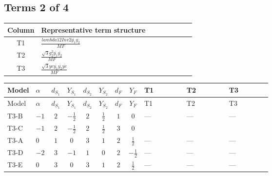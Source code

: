 \documentclass[8pt]{article}
\begin{document}
\begin{landscape}
\subsection*{Terms 2 of 4}
\begin{center}
\begin{tabular}{@{}c >{\raggedright\arraybackslash}p{0.82\linewidth}@{}}
\toprule
Column & Representative term structure \\
\midrule
T1 & \(\displaystyle \frac{lambda12Inv2 \overline{y_{1}} \overline{y_{2}}}{MF}\) \\
\midrule
T2 & \(\displaystyle \frac{\sqrt{3} g_{2}^{2} \overline{y_{1}} \overline{y_{2}}}{MF}\) \\
\midrule
T3 & \(\displaystyle \frac{\sqrt{3} ye \overline{y_{1}} \overline{y_{2}} \overline{ye}}{MF}\) \\
\midrule
\bottomrule
\end{tabular}
\end{center}
\smallskip
\tiny
\begin{longtable}{@{}llcccccc >{\raggedright\arraybackslash}p{0.21\linewidth} >{\raggedright\arraybackslash}p{0.21\linewidth} >{\raggedright\arraybackslash}p{0.21\linewidth}@{}}
\toprule
Model & $\alpha$ & $d_{S_1}$ & $Y_{S_1}$ & $d_{S_2}$ & $Y_{S_2}$ & $d_F$ & $Y_F$ & T1 & T2 & T3 \\
\midrule
\endfirsthead
\toprule
Model & $\alpha$ & $d_{S_1}$ & $Y_{S_1}$ & $d_{S_2}$ & $Y_{S_2}$ & $d_F$ & $Y_F$ & T1 & T2 & T3 \\
\midrule
\endhead
T3-B & $-1$ & $2$ & $-\frac{1}{2}$ & $2$ & $\frac{1}{2}$ & $1$ & $0$ & --- & --- & --- \\
\midrule
T3-C & $-1$ & $2$ & $-\frac{1}{2}$ & $2$ & $\frac{1}{2}$ & $3$ & $0$ & \scriptsize\adjustbox{max width=\linewidth}{$\begin{gathered} \frac{lambda12Inv2 \overline{y_{1}} \overline{y_{2}}}{3 MF}\end{gathered}$} & \scriptsize\adjustbox{max width=\linewidth}{$\begin{gathered} \frac{\sqrt{3} g_{2}^{2} \overline{y_{1}} \overline{y_{2}}}{4 MF}\end{gathered}$} & \scriptsize\adjustbox{max width=\linewidth}{$\begin{gathered} - \frac{\sqrt{3} ye \overline{y_{1}} \overline{y_{2}} \overline{ye}}{12 MF}\end{gathered}$} \\
\midrule
T3-A & $0$ & $1$ & $0$ & $3$ & $1$ & $2$ & $\frac{1}{2}$ & --- & --- & --- \\
\midrule
T3-D & $-2$ & $3$ & $-1$ & $1$ & $0$ & $2$ & $-\frac{1}{2}$ & --- & --- & --- \\
\midrule
T3-E & $0$ & $3$ & $0$ & $3$ & $1$ & $2$ & $\frac{1}{2}$ & --- & --- & --- \\
\midrule
\bottomrule
\end{longtable}
\clearpage

\end{landscape}
\end{document}
